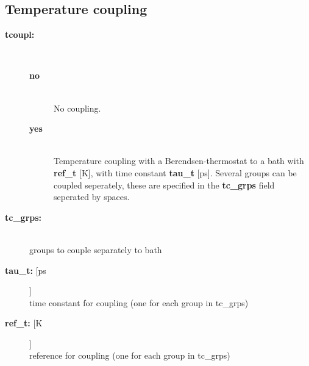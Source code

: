 \subsection{Temperature coupling}
\begin{description}
\item[{\bf tcoupl:}]\mbox{}\\
\vspace{-2ex}\begin{description}
\item[{\bf no}]\mbox{}\\
No  coupling. 
\item[{\bf yes}]\mbox{}\\
Temperature coupling with a Berendsen-thermostat to a bath with
 {\bf ref\_t} [K], with time constant {\bf tau\_t} [ps].
Several groups can be coupled seperately, these are specified in the
{\bf tc\_grps} field seperated by spaces.
\end{description}
\item[{\bf tc\_grps:}]\mbox{}\\
groups to couple separately to  bath
\item[{\bf tau\_t: }[ps]]\mbox{}\\
time constant for coupling (one for each group in tc\_grps)
\item[{\bf ref\_t: }[K]]\mbox{}\\
reference  for coupling (one for each group in tc\_grps)
\end{description}

